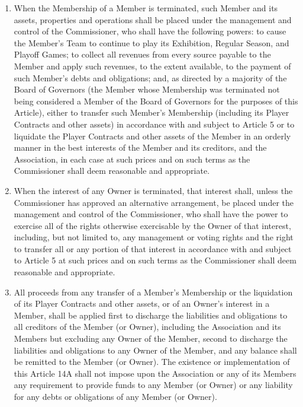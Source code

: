 \documentclass[]{book}
\providecommand{\tightlist}{%
  \setlength{\itemsep}{0pt}\setlength{\parskip}{0pt}}
\begin{document}
\begin{enumerate}
\def\labelenumi{(\alph{enumi})}
\tightlist
\item
  When the Membership of a Member is terminated, such Member and its assets, properties and operations shall be placed under the management and control of the Commissioner, who shall have the following powers: to cause the Member's Team to continue to play its Exhibition, Regular Season, and Playoff Games; to collect all revenues from every source payable to the Member and apply such revenues, to the extent available, to the payment of such Member's debts and obligations; and, as directed by a majority of the Board of Governors (the Member whose Membership was terminated not being considered a Member of the Board of Governors for the purposes of this Article), either to transfer such Member's Membership (including its Player Contracts and other assets) in accordance with and subject to Article 5 or to liquidate the Player Contracts and other assets of the Member in an orderly manner in the best interests of the Member and its creditors, and the Association, in each case at such prices and on such terms as the Commissioner shall deem reasonable and appropriate.
\item
  When the interest of any Owner is terminated, that interest shall, unless the Commissioner has approved an alternative arrangement, be placed under the management and control of the Commissioner, who shall have the power to exercise all of the rights otherwise exercisable by the Owner of that interest, including, but not limited to, any management or voting rights and the right to transfer all or any portion of that interest in accordance with and subject to Article 5 at such prices and on such terms as the Commissioner shall deem reasonable and appropriate.
\item
  All proceeds from any transfer of a Member's Membership or the liquidation of its Player Contracts and other assets, or of an Owner's interest in a Member, shall be applied first to discharge the liabilities and obligations to all creditors of the Member (or Owner), including the Association and its Members but excluding any Owner of the Member, second to discharge the liabilities and obligations to any Owner of the Member, and any balance shall be remitted to the Member (or Owner). The existence or implementation of this Article 14A shall not impose upon the Association or any of its Members any requirement to provide funds to any Member (or Owner) or any liability for any debts or obligations of any Member (or Owner).
\end{enumerate}
\end{document}
